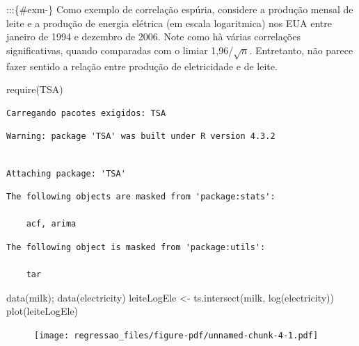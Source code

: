 \documentclass[
  letterpaper,
  DIV=11,
  numbers=noendperiod]{scrartcl}
\newenvironment{Shaded}{\begin{snugshade}}{\end{snugshade}}
\newcommand{\FunctionTok}[1]{\textcolor[rgb]{0.28,0.35,0.67}{#1}}
\newcommand{\NormalTok}[1]{\textcolor[rgb]{0.00,0.23,0.31}{#1}}
\newcommand{\OtherTok}[1]{\textcolor[rgb]{0.00,0.23,0.31}{#1}}
\theoremstyle{plain}
\theoremstyle{plain}
\theoremstyle{definition}
\theoremstyle{definition}
\theoremstyle{remark}
\begin{document}
:::\{\#exm-\} Como exemplo de correlação espúria, considere a produção
mensal de leite e a produção de energia elétrica (em escala logaritmica)
nos EUA entre janeiro de 1994 e dezembro de 2006. Note como hà várias
correlações significativas, quando comparadas com o limiar
1,96/\(\sqrt{n}\). Entretanto, não parece fazer sentido a relação entre
produção de eletricidade e de leite.

\begin{Shaded}
\begin{Highlighting}[]
\FunctionTok{require}\NormalTok{(TSA)}
\end{Highlighting}
\end{Shaded}

\begin{verbatim}
Carregando pacotes exigidos: TSA
\end{verbatim}

\begin{verbatim}
Warning: package 'TSA' was built under R version 4.3.2
\end{verbatim}

\begin{verbatim}

Attaching package: 'TSA'
\end{verbatim}

\begin{verbatim}
The following objects are masked from 'package:stats':

    acf, arima
\end{verbatim}

\begin{verbatim}
The following object is masked from 'package:utils':

    tar
\end{verbatim}

\begin{Shaded}
\begin{Highlighting}[]
\FunctionTok{data}\NormalTok{(milk); }\FunctionTok{data}\NormalTok{(electricity)}
\NormalTok{leiteLogEle }\OtherTok{\textless{}{-}} \FunctionTok{ts.intersect}\NormalTok{(milk, }\FunctionTok{log}\NormalTok{(electricity))}
\FunctionTok{plot}\NormalTok{(leiteLogEle)}
\end{Highlighting}
\end{Shaded}

\begin{figure}[H]

{\centering \texttt{[image: regressao\_files/figure-pdf/unnamed-chunk-4-1.pdf]}

}

\end{figure}
\end{document}
